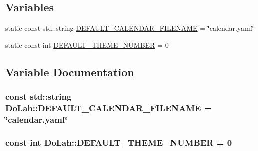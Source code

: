 \subsection*{Variables}
\begin{DoxyCompactItemize}
\item 
static const std\+::string \hyperlink{namespace_do_lah_acc8e3e29b3d0b31096be38b8150dc30b}{D\+E\+F\+A\+U\+L\+T\+\_\+\+C\+A\+L\+E\+N\+D\+A\+R\+\_\+\+F\+I\+L\+E\+N\+A\+M\+E} = \char`\"{}calendar.\+yaml\char`\"{}
\item 
static const int \hyperlink{namespace_do_lah_a402876d8881f389cefc27f0de1af52b3}{D\+E\+F\+A\+U\+L\+T\+\_\+\+T\+H\+E\+M\+E\+\_\+\+N\+U\+M\+B\+E\+R} = 0
\end{DoxyCompactItemize}


\subsection{Variable Documentation}
\hypertarget{namespace_do_lah_acc8e3e29b3d0b31096be38b8150dc30b}{}
\subsubsection[{D\+E\+F\+A\+U\+L\+T\+\_\+\+C\+A\+L\+E\+N\+D\+A\+R\+\_\+\+F\+I\+L\+E\+N\+A\+M\+E}]{\setlength{\rightskip}{0pt plus 5cm}const std\+::string Do\+Lah\+::\+D\+E\+F\+A\+U\+L\+T\+\_\+\+C\+A\+L\+E\+N\+D\+A\+R\+\_\+\+F\+I\+L\+E\+N\+A\+M\+E = \char`\"{}calendar.\+yaml\char`\"{}\hspace{0.3cm}{\ttfamily [static]}}\label{namespace_do_lah_acc8e3e29b3d0b31096be38b8150dc30b}
\hypertarget{namespace_do_lah_a402876d8881f389cefc27f0de1af52b3}{}
\subsubsection[{D\+E\+F\+A\+U\+L\+T\+\_\+\+T\+H\+E\+M\+E\+\_\+\+N\+U\+M\+B\+E\+R}]{\setlength{\rightskip}{0pt plus 5cm}const int Do\+Lah\+::\+D\+E\+F\+A\+U\+L\+T\+\_\+\+T\+H\+E\+M\+E\+\_\+\+N\+U\+M\+B\+E\+R = 0\hspace{0.3cm}{\ttfamily [static]}}\label{namespace_do_lah_a402876d8881f389cefc27f0de1af52b3}
